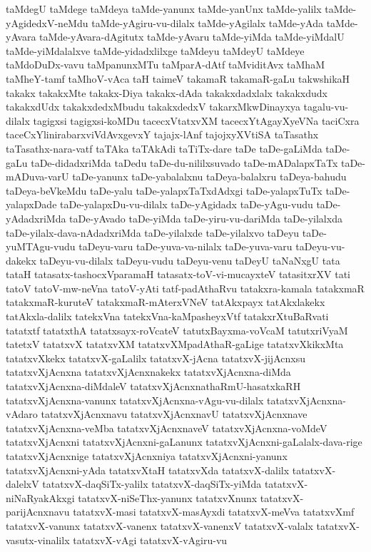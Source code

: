 {taMdegU
taMdege
taMdeya
taMde-yanunx
taMde-yanUnx
taMde-yalilx
taMde-yAgidedxV-neMdu
taMde-yAgiru-vu-dilalx
taMde-yAgilalx
taMde-yAda
taMde-yAvara
taMde-yAvara-dAgitutx
taMde-yAvaru
taMde-yiMda
taMde-yiMdalU
taMde-yiMdalalxve
taMde-yidadxlilxge
taMdeyu
taMdeyU
taMdeye
taMdoDuDx-vavu
taMpanunxMTu
taMparA-dAtf
taMviditAvx
taMhaM
taMheY-tamf
taMhoV-vAca
taH
taimeV
takamaR
takamaR-gaLu
takwshikaH
takakx
takakxMte
takakx-Diya
takakx-dAda
takakxdadxlalx
takakxdudx
takakxdUdx
takakxdedxMbudu
takakxdedxV
takarxMkwDinayxya
tagalu-vu-dilalx
tagigxsi
tagigxsi-koMDu
tacecxVtatxvXM
tacecxYtAgayXyeVNa
taciCxra
taceCxYlinirabarxviVdAvxgevxY
tajajx-lAnf
tajojxyXVtiSA
taTasathx
taTasathx-nara-vatf
taTAka
taTAkAdi
taTiTx-dare
taDe
taDe-gaLiMda
taDe-gaLu
taDe-didadxriMda
taDedu
taDe-du-nililxsuvado
taDe-mADalapxTaTx
taDe-mADuva-varU
taDe-yanunx
taDe-yabalalxnu
taDeya-balalxru
taDeya-bahudu
taDeya-beVkeMdu
taDe-yalu
taDe-yalapxTaTxdAdxgi
taDe-yalapxTuTx
taDe-yalapxDade
taDe-yalapxDu-vu-dilalx
taDe-yAgidadx
taDe-yAgu-vudu
taDe-yAdadxriMda
taDe-yAvado
taDe-yiMda
taDe-yiru-vu-dariMda
taDe-yilalxda
taDe-yilalx-dava-nAdadxriMda
taDe-yilalxde
taDe-yilalxvo
taDeyu
taDe-yuMTAgu-vudu
taDeyu-varu
taDe-yuva-va-nilalx
taDe-yuva-varu
taDeyu-vu-dakekx
taDeyu-vu-dilalx
taDeyu-vudu
taDeyu-venu
taDeyU
taNaNxgU
tata
tataH
tatasatx-tashocxVparamaH
tatasatx-toV-vi-mucayxteV
tatasitxrXV
tati
tatoV
tatoV-mw-neVna
tatoV-yAti
tatf-padAthaRvu
tatakxra-kamala
tatakxmaR
tatakxmaR-kuruteV
tatakxmaR-mAterxVNeV
tatAkxpayx
tatAkxlakekx
tatAkxla-dalilx
tatekxVna
tatekxVna-kaMpasheyxVtf
tatakxrXtuBaRvati
tatatxtf
tatatxthA
tatatxsayx-roVcateV
tatutxBayxma-voVcaM
tatutxriVyaM
tatetxV
tatatxvX
tatatxvXM
tatatxvXMpadAthaR-gaLige
tatatxvXkikxMta
tatatxvXkekx
tatatxvX-gaLalilx
tatatxvX-jAcna
tatatxvX-jijAcnxsu
tatatxvXjAcnxna
tatatxvXjAcnxnakekx
tatatxvXjAcnxna-diMda
tatatxvXjAcnxna-diMdaleV
tatatxvXjAcnxnathaRmU-hasatxkaRH
tatatxvXjAcnxna-vanunx
tatatxvXjAcnxna-vAgu-vu-dilalx
tatatxvXjAcnxna-vAdaro
tatatxvXjAcnxnavu
tatatxvXjAcnxnavU
tatatxvXjAcnxnave
tatatxvXjAcnxna-veMba
tatatxvXjAcnxnaveV
tatatxvXjAcnxna-voMdeV
tatatxvXjAcnxni
tatatxvXjAcnxni-gaLanunx
tatatxvXjAcnxni-gaLalalx-dava-rige
tatatxvXjAcnxnige
tatatxvXjAcnxniya
tatatxvXjAcnxni-yanunx
tatatxvXjAcnxni-yAda
tatatxvXtaH
tatatxvXda
tatatxvX-dalilx
tatatxvX-dalelxV
tatatxvX-daqSiTx-yalilx
tatatxvX-daqSiTx-yiMda
tatatxvX-niNaRyakAkxgi
tatatxvX-niSeThx-yanunx
tatatxvXnunx
tatatxvX-parijAcnxnavu
tatatxvX-masi
tatatxvX-masAyxdi
tatatxvX-meVva
tatatxvXmf
tatatxvX-vanunx
tatatxvX-vanenx
tatatxvX-vanenxV
tatatxvX-valalx
tatatxvX-vasutx-vinalilx
tatatxvX-vAgi
tatatxvX-vAgiru-vu
}
